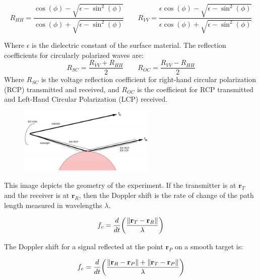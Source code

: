 \documentclass{article}
\theoremstyle{mystyle}
\begin{document}
\begin{equation}
R_{HH} = \frac{\cos(\phi) - \sqrt{\epsilon-\sin^2(\phi)}}{\cos(\phi) + \sqrt{\epsilon - \sin^2(\phi)}} \quad \quad
R_{VV} = \frac{\epsilon \cos(\phi) - \sqrt{\epsilon - \sin^{2}(\phi)}}{\epsilon \cos(\phi) + \sqrt{\epsilon - \sin^2(\phi)}}
\end{equation}

\noindent Where $\epsilon$ is the dielectric constant of the surface material. The reflection coefficients for circularly polarized waves are:
\begin{equation}
R_{SC} = \frac{R_{VV}+R_{HH}}{2} \quad \quad
R_{OC} = \frac{R_{VV}-R_{HH}}{2}
\end{equation}
Where $R_{SC}$ is the voltage reflection coefficient for right-hand circular polarization (RCP) transmitted and received, and $R_{OC}$ is the coefficient for RCP transmitted and Left-Hand Circular Polarization (LCP) received.

\begin{figure}
	\begin{center}
	\includegraphics[width = 0.58\textwidth]{USER_12}
	\end{center}
\end{figure}
\noindent This image depicts the geometry of the experiment. If the transmitter is at $\mathbf{r}_{T}$ and the receiver is at $\mathbf{r}_{R}$, then the Doppler shift is the rate of change of the path length measured in wavelengths $\lambda$. 

\begin{equation}
f_{c} = \frac{d}{dt}\bigg(\frac{\norm{\mathbf{r}_{T}-\mathbf{r}_{R}}}{\lambda}\bigg)
\end{equation}

\noindent The Doppler shift for a signal reflected at the point $\mathbf{r}_{P}$ on a smooth target is:

\begin{equation}
f_{e} = \frac{d}{dt}\bigg(\frac{\norm{\mathbf{r}_{R} - \mathbf{r}_{P}}+\norm{\mathbf{r}_{T}-\mathbf{r}_{P}}}{\lambda}\bigg)
\end{equation}
\end{document}
